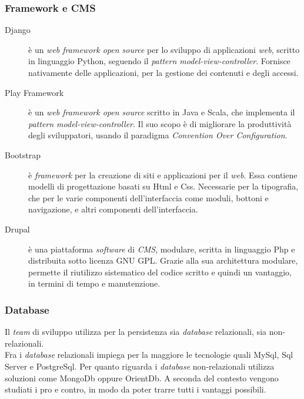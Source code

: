 \subsubsection{Framework e CMS}
\begin{description}
\item[Django] è un \emph{web framework open source} per lo sviluppo di applicazioni \emph{web}, scritto in linguaggio Python, seguendo il \emph{pattern model-view-controller}. Fornisce nativamente delle applicazioni, per la gestione dei contenuti e degli accessi.
\item[Play Framework] è un \emph{web framework open source} scritto in Java e Scala, che implementa il \emph{pattern model-view-controller}. Il suo scopo è di migliorare la produttività degli sviluppatori, usando il paradigma \emph{Convention Over Configuration}.\newpage
\item[Bootstrap] è \emph{framework} per la creazione di siti e applicazioni per il \emph{web}. Essa contiene modelli di progettazione basati su Html e Css. Necessarie per la tipografia, che per le varie componenti dell'interfaccia come moduli, bottoni e navigazione, e altri componenti dell'interfaccia.
\item[Drupal] è una piattaforma \emph{software} di \emph{CMS}, modulare, scritta in linguaggio Php e distribuita sotto licenza GNU GPL. Grazie alla sua architettura modulare, permette il riutilizzo sistematico del codice scritto e quindi un vantaggio, in termini di tempo e manutenzione.
\end{description}

\subsubsection{Database}
Il \emph{team} di sviluppo utilizza per la persistenza sia \emph{database} relazionali, sia non-relazionali.\\Fra i \emph{database} relazionali impiega per la maggiore le tecnologie quali MySql, Sql Server e PostgreSql. Per quanto riguarda i \emph{database} non-relazionali utilizza soluzioni come MongoDb oppure OrientDb. A seconda del contesto vengono studiati i pro e contro, in modo da poter trarre tutti i vantaggi possibili.




\newpage
